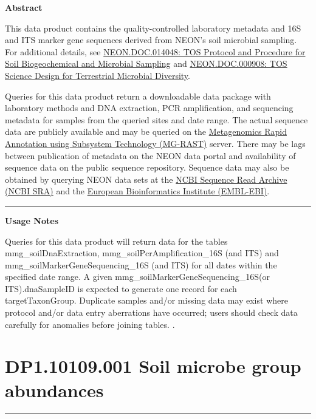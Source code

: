 \documentclass[]{article}
\begin{document}
\textbf{Abstract}

This data product contains the quality-controlled laboratory metadata
and 16S and ITS marker gene sequences derived from NEON's soil microbial
sampling. For additional details, see
\href{http://data.neonscience.org/api/v0/documents/NEON.DOC.014048vB}{NEON.DOC.014048:
TOS Protocol and Procedure for Soil Biogeochemical and Microbial
Sampling} and
\href{http://data.neonscience.org/api/v0/documents/NEON.DOC.000908vA}{NEON.DOC.000908:
TOS Science Design for Terrestrial Microbial Diversity}.

Queries for this data product return a downloadable data package with
laboratory methods and DNA extraction, PCR amplification, and sequencing
metadata for samples from the queried sites and date range. The actual
sequence data are publicly available and may be queried on the
\href{http://metagenomics.anl.gov/}{Metagenomics Rapid Annotation using
Subsystem Technology (MG-RAST)} server. There may be lags between
publication of metadata on the NEON data portal and availability of
sequence data on the public sequence repository. Sequence data may also
be obtained by querying NEON data sets at the
\href{https://www.ncbi.nlm.nih.gov/sra}{NCBI Sequence Read Archive (NCBI
SRA)} and the \href{https://www.ebi.ac.uk/}{European Bioinformatics
Institute (EMBL-EBI)}.

\begin{center}\rule{0.5\linewidth}{\linethickness}\end{center}

\textbf{Usage Notes}

Queries for this data product will return data for the tables
mmg\_soilDnaExtraction, mmg\_soilPcrAmplification\_16S (and ITS) and
mmg\_soilMarkerGeneSequencing\_16S (and ITS) for all dates within the
specified date range. A given mmg\_soilMarkerGeneSequencing\_16S(or
ITS).dnaSampleID is expected to generate one record for each
targetTaxonGroup. Duplicate samples and/or missing data may exist where
protocol and/or data entry aberrations have occurred; users should check
data carefully for anomalies before joining tables. \newpage
.

\section{DP1.10109.001 Soil microbe group
abundances}\label{dp1.10109.001-soil-microbe-group-abundances}

\begin{center}\rule{0.5\linewidth}{\linethickness}\end{center}
\end{document}

